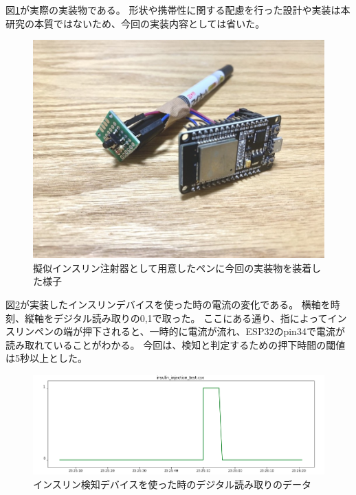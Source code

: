 図\ref{fig:pen_with_switch_n_esp32}が実際の実装物である。
形状や携帯性に関する配慮を行った設計や実装は本研究の本質ではないため、今回の実装内容としては省いた。

\begin{figure}[htbp]
  \caption{擬似インスリン注射器として用意したペンに今回の実装物を装着した様子}
  \label{fig:pen_with_switch_n_esp32}
  \begin{center}
    \includegraphics[bb=0 0 1050 740,width=15cm]{assets/pen_with_switch_n_esp32.jpg}
  \end{center}
\end{figure}

図\ref{fig:insulin_injection_test}が実装したインスリンデバイスを使った時の電流の変化である。
横軸を時刻、縦軸をデジタル読み取りの0,1で取った。
ここにある通り、指によってインスリンペンの端が押下されると、一時的に電流が流れ、ESP32のpin34で電流が読み取れていることがわかる。
今回は、検知と判定するための押下時間の閾値は5秒以上とした。\cite{how_to_inject_insulin_1} \cite{how_to_inject_insulin_2}

\begin{figure}[htbp]
  \caption{インスリン検知デバイスを使った時のデジタル読み取りのデータ}
  \label{fig:insulin_injection_test}
  \begin{center}
    \includegraphics[bb=0 0 1000 350,width=17cm]{assets/insulin_injection_test.png}
  \end{center}
\end{figure}

